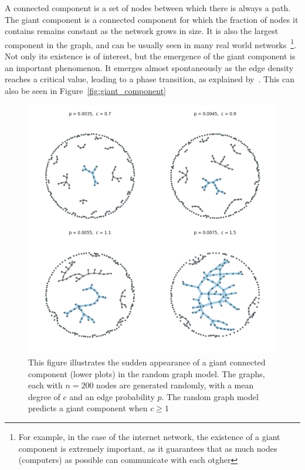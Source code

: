 \documentclass[12pt,beltcrest]{ociamthesis} %
\begin{document}
A connected component is a set of nodes between which there is always a path.
The giant component is a connected component for which the fraction of nodes it contains remains constant as the network grows in size.
It is also the largest component in the graph, and can be usually seen in many real world networks~\footnote{For example, in the case of the internet network, the existence of a giant component is extremely important, as it guarantees that as much nodes (computers) as possible can communicate with each otgher}.
Not only its existence is of interest, but the emergence of the giant component is an important phenomenon.
It emerges almost spontaneously as the edge density reaches a critical value, leading to a phase transition, as explained by~\cite{newman2002random}.
This can also be seen in Figure~\vref{fig:giant_component}
\begin{figure}[tb]
	\centering
	\includegraphics[width=14cm]{figures/giant_component.png}
	\caption[Sudden appearance of the giant component in a random graph]{This figure illustrates the sudden appearance of a giant connected component (lower plots) in the random graph model. The graphs, each with $n=200$ nodes are generated randomly, with a mean degree of $c$ and an edge probability $p$. The random graph model predicts a giant component when $c\ge1$}
	\label{fig:giant_component}
\end{figure}
\end{document}
